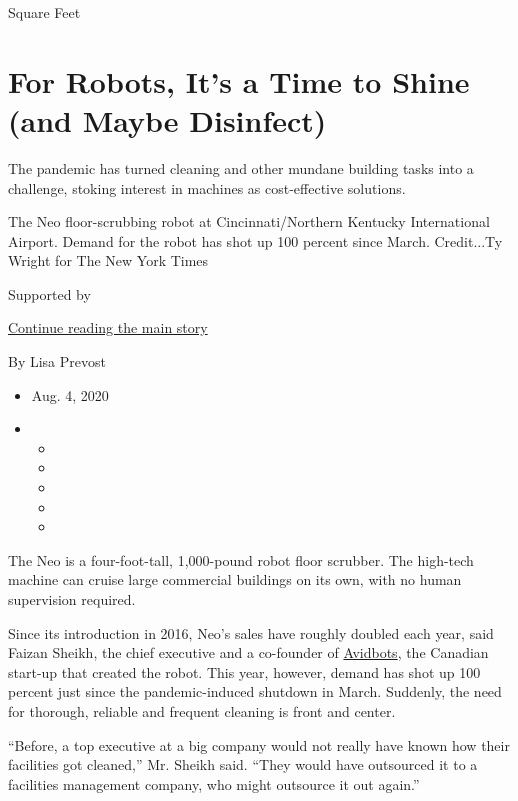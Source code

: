 Square Feet

\hypertarget{for-robots-its-a-time-to-shine-and-maybe-disinfect}{%
\section{For Robots, It's a Time to Shine (and Maybe
Disinfect)}\label{for-robots-its-a-time-to-shine-and-maybe-disinfect}}

The pandemic has turned cleaning and other mundane building tasks into a
challenge, stoking interest in machines as cost-effective solutions.

The Neo floor-scrubbing robot at Cincinnati/Northern Kentucky
International Airport. Demand for the robot has shot up 100 percent
since March. Credit...Ty Wright for The New York Times

Supported by

\protect\hyperlink{after-sponsor}{Continue reading the main story}

By Lisa Prevost

\begin{itemize}
\item
  Aug. 4, 2020
\item
  \begin{itemize}
  \item
  \item
  \item
  \item
  \item
  \end{itemize}
\end{itemize}

The Neo is a four-foot-tall, 1,000-pound robot floor scrubber. The
high-tech machine can cruise large commercial buildings on its own, with
no human supervision required.

Since its introduction in 2016, Neo's sales have roughly doubled each
year, said Faizan Sheikh, the chief executive and a co-founder of
\href{https://www.avidbots.com/}{Avidbots}, the Canadian start-up that
created the robot. This year, however, demand has shot up 100 percent
just since the pandemic-induced shutdown in March. Suddenly, the need
for thorough, reliable and frequent cleaning is front and center.

``Before, a top executive at a big company would not really have known
how their facilities got cleaned,'' Mr. Sheikh said. ``They would have
outsourced it to a facilities management company, who might outsource it
out again.''

